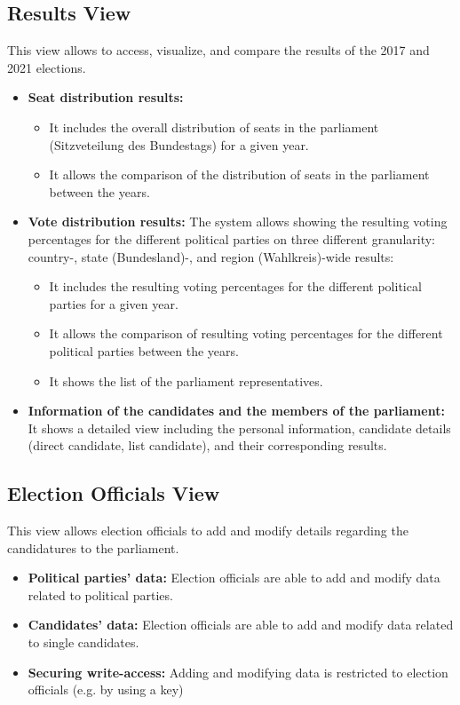 \documentclass[a4paper]{article}
\begin{document}
\subsection{Results View}
This view allows to access, visualize, and compare the results of the 2017 and 2021 elections.
\begin{itemize}
    \item \textbf{Seat distribution results:}
    \begin{itemize}
        \item It includes the overall distribution of seats in the parliament (Sitzveteilung des Bundestags) for a given year.
        \item It  allows the comparison of the distribution of seats in the parliament between the years.
    \end{itemize}
    \item \textbf{Vote distribution results:}
    The system allows showing the resulting voting percentages for the different political parties on three different granularity: country-, state (Bundesland)-, and region (Wahlkreis)-wide results:
        \begin{itemize}
        \item It includes the resulting voting percentages for the different political parties for a given year.
        \item It allows the comparison of resulting voting percentages for the different political parties between the years.
        \item It shows the list of the parliament representatives.
    \end{itemize}
    \item \textbf{Information of the candidates and the members of the parliament:}
    It shows a detailed view including the personal information, candidate details (direct candidate, list candidate), and their corresponding results.
\end{itemize}

\subsection{Election Officials View}
This view allows election officials to add and modify details regarding the candidatures to the parliament.

\begin{itemize}
    \item \textbf{Political parties' data:} Election officials are able to add and modify data related to political parties.
    \item \textbf{Candidates' data:} Election officials are able to add and modify data related to single candidates.
    \item \textbf{Securing write-access:} Adding and modifying data is restricted to election officials (e.g. by using a key)
\end{itemize}
\end{document}
